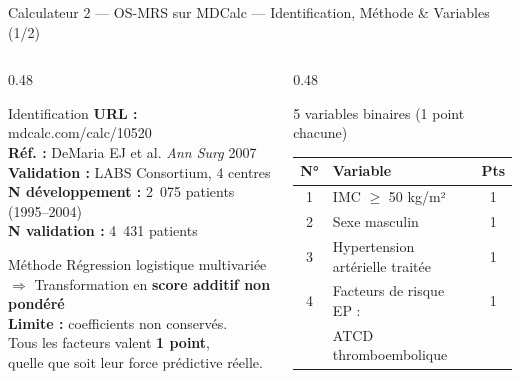 \documentclass[aspectratio=169]{beamer}
\begin{document}
\begin{frame}{Calculateur 2 --- OS-MRS sur MDCalc --- Identification, Méthode \& Variables (1/2)}
  \begin{columns}[T]
    \begin{column}{0.48\textwidth}
      \begin{block}{Identification}
        \footnotesize
        \textbf{URL :} mdcalc.com/calc/10520\\
        \textbf{Réf. :} DeMaria EJ et al. \textit{Ann Surg} 2007\\
        \textbf{Validation :} LABS Consortium, 4 centres\\[4pt]
        \textbf{N développement :} 2~075 patients (1995--2004)\\
        \textbf{N validation :} 4~431 patients
      \end{block}
      \vspace{0.4em}
      \begin{block}{Méthode}
        \footnotesize
        Régression logistique multivariée\\[4pt]
        $\Rightarrow$ Transformation en \textbf{score additif non pondéré}\\[4pt]
        \textcolor{rougealerte}{\textbf{Limite :} coefficients non conservés.\\
        Tous les facteurs valent \textbf{1 point},\\
        quelle que soit leur force prédictive réelle.}
      \end{block}
    \end{column}
    \begin{column}{0.48\textwidth}
      \begin{block}{5 variables binaires (1 point chacune)}
        \footnotesize
        \begin{tabular}{clc}
          \toprule
          \textbf{N°} & \textbf{Variable} & \textbf{Pts} \\
          \midrule
          1 & IMC $\geq$ 50 kg/m² & 1 \\[3pt]
          2 & Sexe masculin & 1 \\[3pt]
          3 & Hypertension artérielle traitée & 1 \\[3pt]
          4 & Facteurs de risque EP : & 1 \\
            & \quad ATCD thromboembolique & \\

\end{tabular}
\end{block}
\end{column}
\end{columns}
\end{frame}
\end{document}
